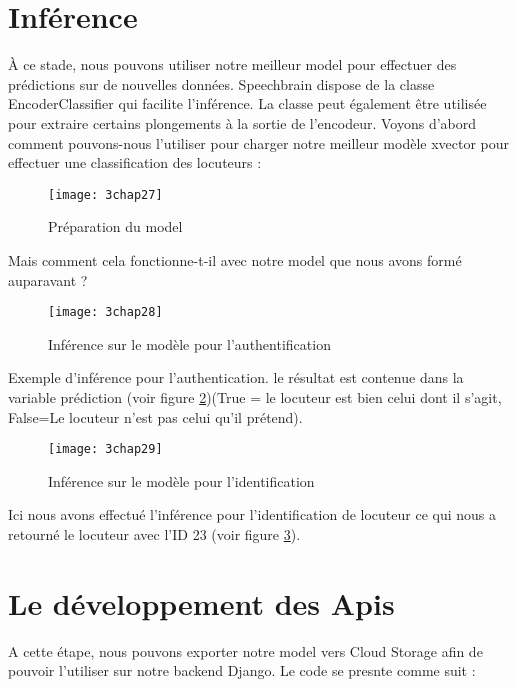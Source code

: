 \section{Inférence}
À ce stade, nous pouvons utiliser notre meilleur model pour effectuer des prédictions sur de nouvelles données. Speechbrain dispose de la classe EncoderClassifier qui facilite l'inférence. La classe peut également être utilisée pour extraire certains plongements à la sortie de l'encodeur.
Voyons d'abord comment pouvons-nous l'utiliser pour charger notre meilleur modèle xvector   pour  effectuer une classification des locuteurs :

\begin{figure}[h]
	\centering
	\texttt{[image: 3chap27]}
	\caption{Préparation du model  }
	\label{fig:3chap27}
\end{figure}

Mais comment cela fonctionne-t-il avec notre model que nous avons formé auparavant ?

\begin{figure}[h]
	\centering
	\texttt{[image: 3chap28]}
	\caption{Inférence sur le modèle pour l'authentification }
	\label{fig:3chap28}
\end{figure}

Exemple d’inférence pour l’authentication. le résultat est contenue dans la variable prédiction (voir figure \ref{fig:3chap28})(True = le locuteur est bien celui dont il s’agit, False=Le locuteur n’est pas celui qu’il prétend). 


\begin{figure}[h]
	\centering
	\texttt{[image: 3chap29]}
	\caption{Inférence sur le modèle pour l'identification }
	\label{fig:3chap29}
\end{figure}
Ici nous avons effectué l’inférence pour l’identification de locuteur ce qui nous a retourné le locuteur avec l’ID 23 (voir figure \ref{fig:3chap29}).

\section{Le développement des Apis}
A cette étape, nous pouvons exporter notre model vers Cloud Storage afin de pouvoir l’utiliser sur notre backend Django.
Le code se presnte comme suit :



